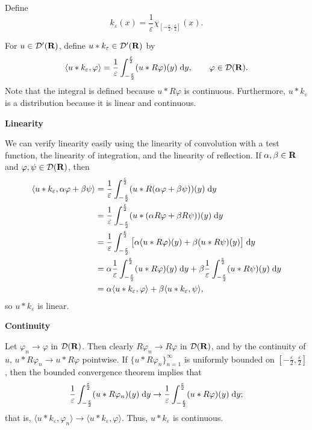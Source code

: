 \documentclass{homework}
\begin{document}
	\maketitle
	
	Define
	\begin{equation}
		k_\varepsilon(x) = \frac{1}{\varepsilon}\chi_{\left[-\frac{\varepsilon}{2}, \frac{\varepsilon}{2}\right]}(x).
	\end{equation}
	
	\question For $u \in \mathcal{D}'(\textnormal{\bf R})$, define $u * k_\varepsilon \in \mathcal{D}'(\textnormal{\bf R})$ by
	\begin{equation}
		\label{eq:convolution_defn}
		\langle u * k_\varepsilon, \varphi \rangle = \frac{1}{\varepsilon}\int_{-\frac{\varepsilon}{2}}^\frac{\varepsilon}{2}(u * R\varphi)(y)\;\text{d} y, \qquad \varphi \in \mathcal{D}(\textnormal{\bf R}).
	\end{equation}
	Note that the integral is defined because $u * R\varphi$ is continuous. Furthermore, $u*k_\varepsilon$ is a distribution because it is linear and continuous. 
	
	\textbf{Linearity} 
	
	We can verify linearity easily using the linearity of convolution with a test function, the linearity of integration, and the linearity of reflection. If $\alpha, \beta \in \textnormal{\bf R}$ and $\varphi, \psi \in \mathcal{D}(\textnormal{\bf R})$, then
	\begin{align}
		\langle u * k_\varepsilon, \alpha \varphi + \beta \psi \rangle &= \frac{1}{\varepsilon}\int_{-\frac{\varepsilon}{2}}^\frac{\varepsilon}{2} (u * R(\alpha\varphi + \beta\psi))(y)\;\text{d} y \\
		&= \frac{1}{\varepsilon}\int_{-\frac{\varepsilon}{2}}^\frac{\varepsilon}{2} (u * (\alpha R\varphi + \beta R\psi))(y)\;\text{d} y \\
		&= \frac{1}{\varepsilon}\int_{-\frac{\varepsilon}{2}}^\frac{\varepsilon}{2}\big[ \alpha (u * R\varphi)(y) + \beta (u * R\psi)(y)\big] \;\text{d} y \\
		&= \alpha \frac{1}{\varepsilon}\int_{-\frac{\varepsilon}{2}}^\frac{\varepsilon}{2} (u * R\varphi)(y)\;\text{d} y + \beta \frac{1}{\varepsilon}\int_{-\frac{\varepsilon}{2}}^\frac{\varepsilon}{2}(u*R\psi)(y)\;\text{d} y \\
		&= \alpha\langle u * k_\varepsilon, \varphi\rangle + \beta\langle u*k_\varepsilon, \psi\rangle,
	\end{align}
	so $u * k_\varepsilon$ is linear.
	
	\textbf{Continuity}
	
	Let $\varphi_n \to \varphi$ in $\mathcal{D}(\textnormal{\bf R})$. Then clearly $R\varphi_n \to R\varphi$ in $\mathcal{D}(\textnormal{\bf R})$, and by the continuity of $u$, $u * R\varphi_n \to u * R\varphi$ pointwise. If $\{u*R\varphi_n\}_{n=1}^\infty$ is uniformly bounded on $\left[-\frac{\varepsilon}{2},\frac{\varepsilon}{2}\right]$, then the bounded convergence theorem implies that
	\begin{equation}
		\frac{1}{\varepsilon}\int_{-\frac{\varepsilon}{2}}^\frac{\varepsilon}{2}(u*R\varphi_n)(y)\;\text{d} y \to 
		\frac{1}{\varepsilon}\int_{-\frac{\varepsilon}{2}}^\frac{\varepsilon}{2}(u*R\varphi)(y)\;\text{d} y;
	\end{equation}
	that is, $\langle u * k_\varepsilon, \varphi_n\rangle \to \langle u*k_\varepsilon, \varphi\rangle$. Thus, $u*k_\varepsilon$ is continuous.
	
\end{document}
